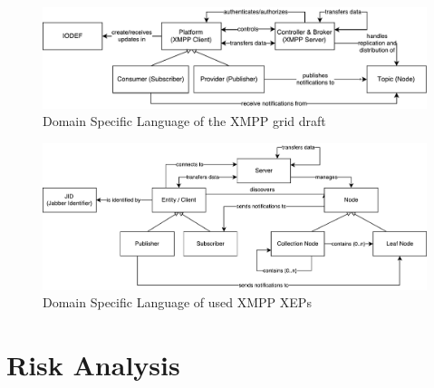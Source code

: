 \begin{figure}[h]
\centering
\includegraphics[width=\linewidth]{resources/architecture_dsl_grid_draft}
\caption[DSL of XMPP grid draft]{Domain Specific Language of the XMPP grid draft}
\label{fig:architecturedslgriddraft}
\end{figure}

\begin{figure}[h]
\centering
\includegraphics[width=\linewidth]{resources/architecture_dsl_xeps}
\caption[DSL of used XMPP XEPs]{Domain Specific Language of used XMPP XEPs}
\label{fig:architecturedslxeps}
\end{figure}


\section{Risk Analysis}
